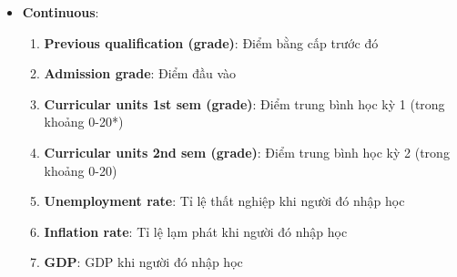 \begin{itemize}
\begin{itemize}
            \item \textbf{Continuous}:
                \begin{enumerate}[resume]
                    \item \textbf{Previous qualification (grade)}: Điểm bằng cấp trước đó

                    \item \textbf{Admission grade}: Điểm đầu vào
                
                    \item \textbf{Curricular units 1st sem (grade)}: Điểm trung bình học kỳ 1 (trong khoảng 0-20\hypertarget{line:1-grade1}{*})

                    \item \textbf{Curricular units 2nd sem (grade)}: Điểm trung bình học kỳ 2 (trong khoảng 0-20)

                    \item \textbf{Unemployment rate}: Tỉ lệ thất nghiệp khi người đó nhập học

                    \item \textbf{Inflation rate}: Tỉ lệ lạm phát khi người đó nhập học
                    
                    \item \textbf{GDP}: GDP khi người đó nhập học
                    
                \end{enumerate}

            
        \end{itemize}
        
    \end{itemize}
    

